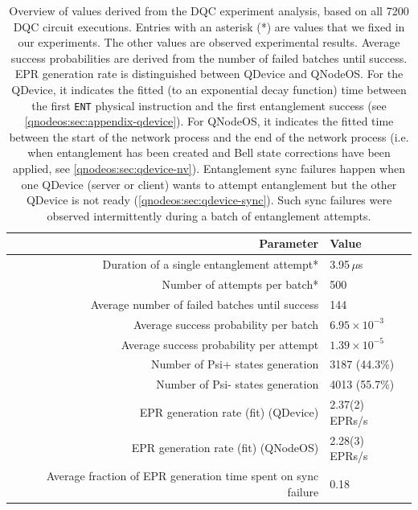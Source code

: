 \begin{table}[t]
    \centering
    \begin{tabular}{|r|l|}
    \hline
    \textbf{Parameter} & \textbf{Value} \\ 
    \hline
    Duration of a single entanglement attempt* & 3.95\,$\mu$s \\
    Number of attempts per batch* & 500 \\
    Average number of failed batches until success & 144 \\
    Average success probability per batch & $6.95 \times 10^{-3}$ \\
    Average success probability per attempt & $1.39 \times 10^{-5}$ \\
    Number of Psi+ states generation & 3187 (44.3\%) \\
    Number of Psi- states generation & 4013 (55.7\%) \\
    EPR generation rate (fit) (QDevice) & 2.37(2) EPRs/s \\
    EPR generation rate (fit) (QNodeOS) & 2.28(3) EPRs/s \\
    Average fraction of EPR generation time spent on sync failure & 0.18 \\
    
    \hline
    \end{tabular}
    \caption{Overview of values derived from the \ac{DQC} experiment analysis, based on all 7200 \ac{DQC} circuit executions. Entries with an asterisk (*) are values that we fixed in our experiments. The other values are observed experimental results. Average success probabilities are derived from the number of failed batches until success.
    \ac{EPR} generation rate is distinguished between \ac{QDevice} and \ac{QNodeOS}. For the \ac{QDevice}, it indicates the fitted (to an exponential decay function) time between the first \texttt{ENT} physical instruction and the first entanglement success (see \cref{qnodeos:sec:appendix-qdevice}). For \ac{QNodeOS}, it indicates the fitted time between the start of the network process and the end of the network process (i.e. when entanglement has been created and Bell state corrections have been applied, see \cref{qnodeos:sec:qdevice-nv}). Entanglement sync failures happen when one \ac{QDevice} (server or client) wants to attempt entanglement but the other \ac{QDevice} is not ready (\cref{qnodeos:sec:qdevice-sync}). Such sync failures were observed intermittently during a batch of entanglement attempts.}
    \label{tab:entanglement_stats}
\end{table}

